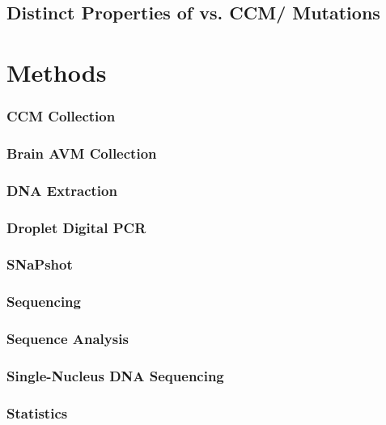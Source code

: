 \subsection{Distinct Properties of  vs. CCM/ Mutations}

\section{Methods}
\subsubsection{CCM Collection}
\subsubsection{Brain AVM Collection}
\subsubsection{DNA Extraction}
\subsubsection{Droplet Digital PCR}
\subsubsection{SNaPshot}
\subsubsection{Sequencing}
\subsubsection{Sequence Analysis}
\subsubsection{Single-Nucleus DNA Sequencing}
\subsubsection{Statistics}